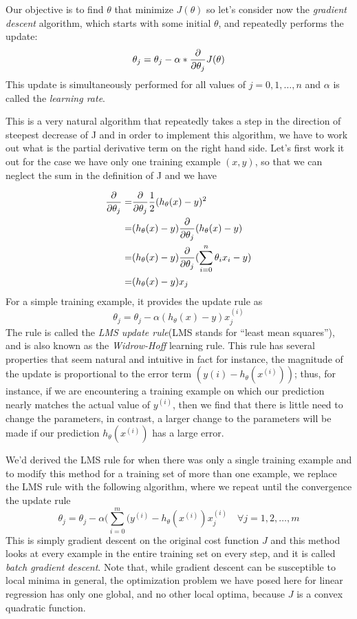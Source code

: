Our objective is to find $\theta$ that minimize $J(\theta)$ so let’s consider now
the \emph{gradient descent} algorithm, which starts with some initial $\theta$, and repeatedly performs the update:
\[ \theta_j = \theta_j - \alpha * \frac{\partial}{\partial \theta_j} J(\theta) \]
This update is simultaneously performed for all values of $j= 0, 1, \dots, n$ and 
$\alpha$ is called the \emph{learning rate}.

This is a very natural algorithm that repeatedly takes a step in the direction of steepest decrease of J
and in order to implement this algorithm, we have to work out what is 
the partial derivative term on the right hand side.\newline
Let’s first work it out for the case we have only one training example $(x, y)$, so that we
can neglect the sum in the definition of J and we have 

\begin{align*}
    \frac{\partial}{\partial \theta_j} = & \frac{\partial}{\partial \theta_j} \frac{1}{2} (h_{\theta}(x) - y)^2 \\
                          = & (h_{\theta}(x) - y) \frac{\partial}{\partial \theta_j} (h_{\theta}(x)-y) \\
                          = & (h_{\theta}(x) - y) \frac{\partial}{\partial \theta_j} (\sum _{i = 0}^n \theta_i x_i - y) \\
                          = & (h_{\theta}(x) - y)x_j \\
\end{align*}
For a simple training example, it provides the update rule as
\[ \theta_j = \theta_j - \alpha (h_{\theta}(x) - y)x_j ^{(i)} \]
The rule is called the \emph{LMS update rule}(LMS stands for “least mean squares”), and is also known
as the \emph{Widrow-Hoff} learning rule.\newline
This rule has several properties that seem natural and intuitive in fact for instance, the magnitude of 
    the update is proportional to the error term $(y(i) - h_{\theta}(x^{(i)}))$; 
thus, for instance, if we are encountering a training example on which our prediction nearly matches
the actual value of $y^{(i)}$, then we find that there is little need to change the parameters,
in contrast, a larger change to the parameters will be made if our prediction $h_{\theta}(x^{(i)})$ 
has a large error.

We’d derived the LMS rule for when there was only a single training example and 
to modify this method for a training set of more than one example,
we replace the LMS rule with the following algorithm, where we repeat until the convergence the update rule
\[ \theta_j = \theta_j - \alpha (\sum _{i=0}^m (y^{(i)} - h_{\theta}(x^{(i)}) x_j^{(i)} 
   \quad \forall j = 1, 2, \dots, m \]
This is simply gradient descent on the original cost function $J$ and this method looks at every example
in the entire training set on every step, and it is called \emph{batch gradient descent}.\newline
Note that, while gradient descent can be susceptible to local minima in general, the optimization problem
we have posed here for linear regression has only one global, and no other local optima, because 
$J$ is a convex quadratic function.

